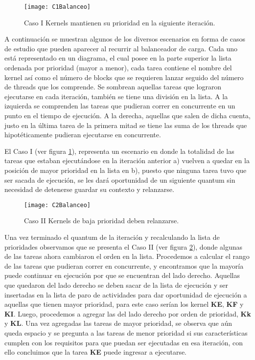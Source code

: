     \begin{figure}[!]
      \centering
        \texttt{[image: C1Balanceo]}
        \caption{Caso I Kernels mantienen su prioridad en la siguiente iteración.}
        \label{fig:C1Balanceo}
    \end{figure}

A continuación se muestran algunos de los diversos escenarios en forma de casos de estudio que pueden aparecer al recurrir al balanceador de carga. Cada uno está representado en un diagrama, el cual posee en la parte superior la lista ordenada por prioridad (mayor a menor), cada tarea contiene el nombre del kernel así como el número de blocks que se requieren lanzar seguido del número de threads que los comprende. Se sombrean aquellas tareas que lograron ejecutarse en cada iteración, también se tiene una división en la lista. A la izquierda se comprenden las tareas que pudieran correr en concurrente en un punto en el tiempo de ejecución. A la derecha, aquellas que salen de dicha cuenta, justo en la última tarea de la primera mitad se tiene las suma de los threads que hipotéticamente pudieran ejecutarse en concurrente.
\newline

El Caso I (ver figura \ref{fig:C1Balanceo}), representa un escenario en donde la totalidad de las tareas que estaban ejecutándose en la iteración anterior a) vuelven a quedar en la posición de mayor prioridad en la lista en b), puesto que ninguna tarea tuvo que ser sacada de ejecución, se les dará oportunidad de un siguiente quantum sin necesidad de detenerse guardar su contexto y relanzarse.
    \newline
    
    \begin{figure}[!]
      \centering
        \texttt{[image: C2Balanceo]}
        \caption{Caso II Kernels de baja prioridad deben relanzarse.}
        \label{fig:C2Balanceo}
    \end{figure}
    
    Una vez terminado el quantum de la iteración y recalculando la lista de prioridades observamos que se presenta el Caso II (ver figura \ref{fig:C2Balanceo}), donde algunas de las tareas ahora cambiaron el orden en la lista. Procedemos a calcular el rango de las tareas que pudieran correr en concurrente, y encontramos que la mayoría puede continuar en ejecución por que se encuentran del lado derecho. Aquellas que quedaron del lado derecho se deben sacar de la lista de ejecución y ser insertadas en la lista de paro de actividades para dar oportunidad de ejecución a aquellas que tienen mayor prioridad, para este caso serían los kernel \textbf{KE}, \textbf{KF} y \textbf{KI}. Luego, procedemos a agregar las del lado derecho por orden de prioridad, \textbf{Kk} y \textbf{KL}. 
    Una vez agregadas las tareas de mayor prioridad, se observa que aún queda espacio y se pregunta a las tareas de menor prioridad si sus características cumplen con los requisitos para que puedan ser ejecutadas en esa iteración, con ello concluimos que la tarea \textbf{KE} puede ingresar a ejecutarse.     
    \newline
    
